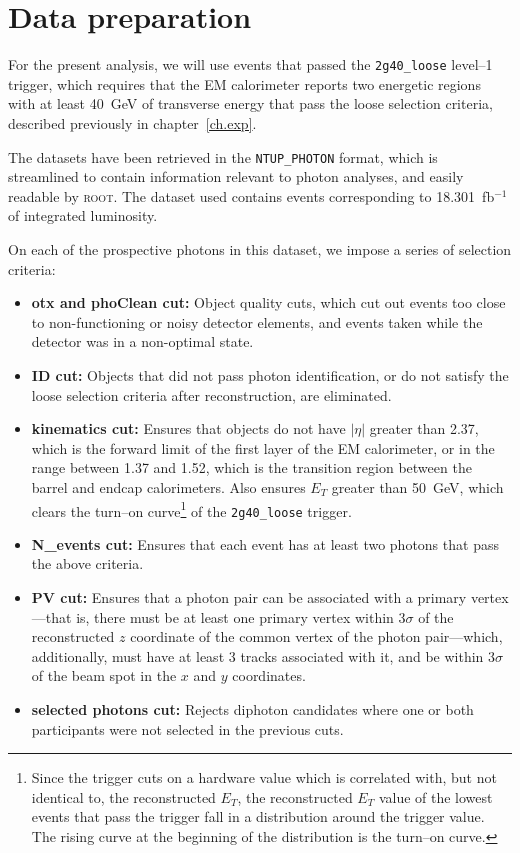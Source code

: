 \chapter{Data preparation \label{ch.data}}

For the present analysis, we will use events that passed the \texttt{2g40\_loose} level--1 trigger, which requires that the EM calorimeter reports two energetic regions with at least 40~GeV of transverse energy that pass the loose selection criteria, described previously in chapter~\ref{ch.exp}.

The datasets have been retrieved in the \texttt{NTUP\_PHOTON} format, which is streamlined to contain information relevant to photon analyses, and easily readable by \textsc{root}. The dataset used contains events corresponding to 18.301~fb$^{-1}$ of integrated luminosity.

On each of the prospective photons in this dataset, we impose a series of selection criteria:

\begin{itemize}
\item \textbf{otx and phoClean cut:} Object quality cuts, which cut out events too close to non-functioning or noisy detector elements, and events taken while the detector was in a non-optimal state.
\item \textbf{ID cut:} Objects that did not pass photon identification, or do not satisfy the loose selection criteria after reconstruction, are eliminated.
\item \textbf{kinematics cut:} Ensures that objects do not have $|\eta|$ greater than 2.37, which is the forward limit of the first layer of the EM calorimeter, or in the range between 1.37 and 1.52, which is the transition region between the barrel and endcap calorimeters. Also ensures $E_T$ greater than 50~GeV, which clears the turn--on curve\footnote{Since the trigger cuts on a hardware value which is correlated with, but not identical to, the reconstructed $E_T$, the reconstructed $E_T$ value of the lowest events that pass the trigger fall in a distribution around the trigger value. The rising curve at the beginning of the distribution is the turn--on curve.} of the \texttt{2g40\_loose} trigger.
\item \textbf{N\_events cut:} Ensures that each event has at least two photons that pass the above criteria.
\item \textbf{PV cut:} Ensures that a photon pair can be associated with a primary vertex---that is, there must be at least one primary vertex within 3$\sigma$ of the reconstructed $z$ coordinate of the common vertex of the photon pair---which, additionally, must have at least 3 tracks associated with it, and be within 3$\sigma$ of the beam spot in the $x$ and $y$ coordinates.
\item \textbf{selected photons cut:} Rejects diphoton candidates where one or both participants were not selected in the previous cuts.

\end{itemize}

